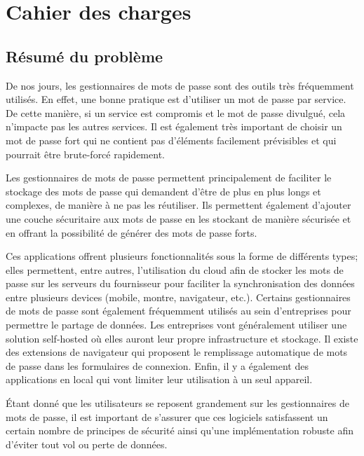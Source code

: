 

\chapter{Cahier des charges}



\section*{Résumé du problème}
De nos jours, les gestionnaires de mots de passe sont des outils très fréquemment utilisés. En effet, une bonne pratique est d'utiliser un mot de passe par service. De cette manière, si un service est compromis et le mot de passe divulgué, cela n'impacte pas les autres services. Il est également très important de choisir un mot de passe fort qui ne contient pas d'éléments facilement prévisibles et qui pourrait être brute-forcé rapidement. 

Les gestionnaires de mots de passe permettent principalement de faciliter le stockage des mots de passe qui demandent d'être de plus en plus longs et complexes, de manière à ne pas les réutiliser. Ils permettent également d'ajouter une couche sécuritaire aux mots de passe en les stockant de manière sécurisée et en offrant la possibilité de générer des mots de passe forts.

Ces applications offrent plusieurs fonctionnalités sous la forme de différents types;  elles permettent, entre autres, l'utilisation du cloud afin de stocker les mots de passe sur les serveurs du fournisseur pour faciliter la synchronisation des données entre plusieurs devices (mobile, montre, navigateur, etc.). Certains gestionnaires de mots de passe sont également fréquemment utilisés au sein d'entreprises pour permettre le partage de données. Les entreprises vont généralement utiliser une solution self-hosted où elles auront leur propre infrastructure et stockage. Il existe des extensions de navigateur  qui proposent le remplissage automatique de mots de passe dans les formulaires de connexion. Enfin, il y a également des applications en local qui vont limiter leur utilisation à un seul appareil.

Étant donné que les utilisateurs se reposent grandement sur les gestionnaires de mots de passe, il est important de s'assurer que ces logiciels satisfassent un certain nombre de principes de sécurité ainsi qu'une implémentation robuste afin d'éviter tout vol ou perte de données. 

